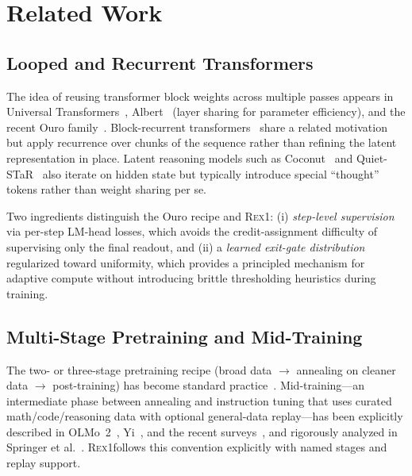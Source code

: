 \documentclass[11pt,a4paper]{article}
\newcommand{\REX}{\textsc{Rex1}\xspace}
\providecommand{\xspace}{}
\begin{document}
\section{Related Work}

\subsection{Looped and Recurrent Transformers}

The idea of reusing transformer block weights across multiple passes appears
in Universal Transformers~\cite{universal-transformer}, Albert~\cite{albert}
(layer sharing for parameter efficiency), and the recent Ouro
family~\cite{ouro2025}. Block-recurrent
transformers~\cite{block-recurrent-transformer} share a related motivation
but apply recurrence over chunks of the sequence rather than refining the
latent representation in place. Latent reasoning models such as
Coconut~\cite{coconut} and Quiet-STaR~\cite{quietstar} also iterate on hidden
state but typically introduce special ``thought'' tokens rather than weight
sharing per se.

Two ingredients distinguish the Ouro recipe and \REX:
(i) \emph{step-level supervision} via per-step LM-head losses, which avoids
the credit-assignment difficulty of supervising only the final readout, and
(ii) a \emph{learned exit-gate distribution} regularized toward uniformity,
which provides a principled mechanism for adaptive compute without
introducing brittle thresholding heuristics during training.

\subsection{Multi-Stage Pretraining and Mid-Training}

The two- or three-stage pretraining recipe (broad data $\rightarrow$
annealing on cleaner data $\rightarrow$ post-training) has become standard
practice~\cite{nemotron,olmo2,llama3}. Mid-training---an intermediate
phase between annealing and instruction tuning that uses curated
math/code/reasoning data with optional general-data replay---has been
explicitly described in OLMo~2~\cite{olmo2}, Yi~\cite{yi}, and the recent
surveys~\cite{midtrain2025,midtrain-survey-23081}, and rigorously analyzed
in Springer et al.~\cite{springer-midtrain}. \REX follows this convention
explicitly with named stages and replay support.
\end{document}
